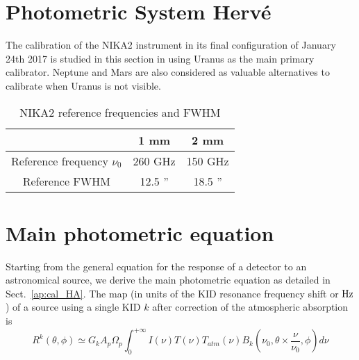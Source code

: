 %






\section{Photometric System {\color{blue} Herv\'e}}
\label{se:cal_HA_reference}

The calibration of the NIKA2 instrument in its final configuration of
January 24th 2017 is studied in this section in using Uranus as the
main primary calibrator. Neptune and Mars are also considered as
valuable alternatives to calibrate when Uranus is not visible.

\begin{table}[h]
\begin{center}
\begin{tabular}{|c|c|c|}
\hline
     & 1 mm & 2 mm \\
\hline
Reference frequency $\nu_{0}$ & 260 GHz & 150 GHz \\
\hline
Reference FWHM                      & 12.5  '' & 18.5 '' \\
\hline
\end{tabular}
\caption{NIKA2 reference frequencies and FWHM}
\end{center}
\label{tab:definitions}
\end{table}

\section{Main photometric equation}
\label{se:cal_HA_main}

Starting from the general equation for the response of a detector to
an astronomical source, we derive the main photometric equation as
detailed in Sect.~\ref{ap:cal_HA}.
The map (in units of the KID resonance frequency shift or $\rm Hz$) of a source using a single KID $k$
after correction of the atmospheric absorption is
\begin{equation}
R^{k}(\theta, \phi) \simeq G_{k}  A_{p}\Omega_{p} \int_{0}^{+\infty} I(\nu)
T(\nu) T_{atm}(\nu) B_{k}(\nu_{0}, \theta \times \frac{\nu}{\nu_{0}},
\phi) d\nu 
\label{eq:mainphot}
\end{equation}

